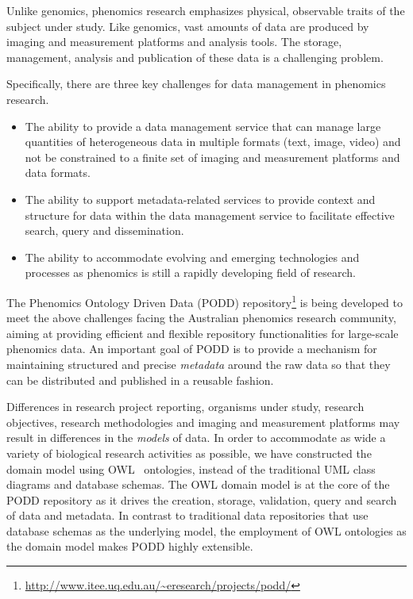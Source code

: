 \documentclass{llncs}
\begin{document}
Unlike genomics, phenomics research emphasizes physical, observable
traits of the subject under study. Like genomics, vast amounts of
data are produced by imaging and measurement platforms and analysis
tools. The storage, management, analysis and publication of these
data is a challenging problem.

Specifically, there are three key challenges for data management in
phenomics research.
\begin{itemize}
\item The ability to provide a data management service that can
manage large quantities of heterogeneous data in multiple formats
(text, image, video) and not be constrained to a finite set of
imaging and measurement platforms and data formats.

\item The ability to support metadata-related services to
provide context and structure for data within the data management
service to facilitate effective search, query and dissemination.

\item The ability to accommodate evolving and emerging technologies
and processes as phenomics is still a rapidly developing field of
research.
\end{itemize}

The Phenomics Ontology Driven Data (PODD)
repository\footnote{\url{http://www.itee.uq.edu.au/~eresearch/projects/podd/}}
is being developed to meet the above challenges facing the
Australian phenomics research community, aiming at providing
efficient and flexible repository functionalities for large-scale
phenomics data. An important goal of PODD is to provide a mechanism
for maintaining structured and precise \emph{metadata} around the
raw data so that they can be distributed and published in a reusable
fashion.

Differences in research project reporting, organisms under study,
research objectives, research methodologies and imaging and
measurement platforms may result in differences in the \emph{models}
of data. In order to accommodate as wide a variety of biological
research activities as possible, we have constructed the domain
model using OWL~\cite{hoph03a} ontologies, instead of the
traditional UML class diagrams and database schemas. The OWL domain
model is at the core of the PODD repository as it drives the
creation, storage, validation, query and search of data and
metadata. In contrast to traditional data repositories that use
database schemas as the underlying model, the employment of OWL
ontologies as the domain model makes PODD highly extensible.
\end{document}
